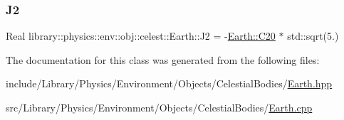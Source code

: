 \mbox{\label{classlibrary_1_1physics_1_1env_1_1obj_1_1celest_1_1_earth_a45eb6624c62b847e0f2c59f7b6a7aad5}} 
\subsubsection{\texorpdfstring{J2}{J2}}
{\footnotesize\ttfamily Real library\+::physics\+::env\+::obj\+::celest\+::\+Earth\+::\+J2 = -\/\hyperlink{classlibrary_1_1physics_1_1env_1_1obj_1_1celest_1_1_earth_a0acd5f5fe99a0aacc7175fe0a140360f}{Earth\+::\+C20} $\ast$ std\+::sqrt(5.)\hspace{0.3cm}{\ttfamily [static]}}



The documentation for this class was generated from the following files\+:\begin{DoxyCompactItemize}
\item 
include/\+Library/\+Physics/\+Environment/\+Objects/\+Celestial\+Bodies/\hyperlink{_earth_8hpp}{Earth.\+hpp}\item 
src/\+Library/\+Physics/\+Environment/\+Objects/\+Celestial\+Bodies/\hyperlink{_earth_8cpp}{Earth.\+cpp}\end{DoxyCompactItemize}
